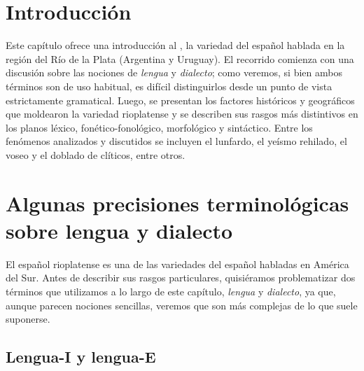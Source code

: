 
\section{Introducción}

Este capítulo ofrece una introducción al , la
variedad del español hablada en la región del Río de la Plata (Argentina y
Uruguay). El recorrido comienza con una discusión sobre las nociones de
\textit{lengua} y \textit{dialecto}; como veremos, si bien ambos términos son de
uso habitual, es difícil distinguirlos desde un punto de vista estrictamente
gramatical. Luego, se presentan los factores históricos y geográficos que
moldearon la variedad rioplatense y se describen sus rasgos más distintivos en
los planos léxico, fonético-fonológico, morfológico y sintáctico. Entre los
fenómenos analizados y discutidos se incluyen el lunfardo, el yeísmo rehilado,
el voseo y el doblado de clíticos, entre otros.

\section{Algunas precisiones terminológicas sobre lengua y dialecto}\label{sec:15-terminologia}

El español rioplatense es una de las variedades del español habladas en América
del Sur. Antes de describir sus rasgos particulares, quisiéramos problematizar
dos términos que utilizamos a lo largo de este capítulo, \textit{lengua} y
\textit{dialecto}, ya que, aunque parecen nociones sencillas, veremos que son más
complejas de lo que suele suponerse.

\subsection{Lengua-I y lengua-E}\label{sec:15-lenguai}

